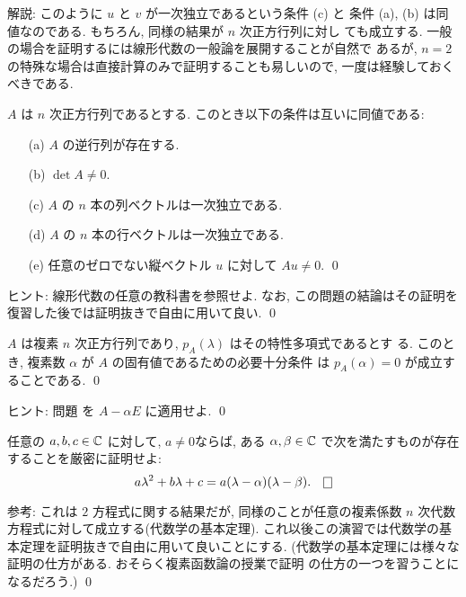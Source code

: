 \documentclass[12pt,twoside]{jarticle}
\begin{document}
\noindent 
解説: このように $u$ と $v$ が一次独立であるという条件 (c) と
条件 (a), (b) は同値なのである. もちろん, 同様の結果が $n$ 次正方行列に対し
ても成立する. 一般の場合を証明するには線形代数の一般論を展開することが自然で
あるが, $n=2$ の特殊な場合は直接計算のみで証明することも易しいので, 
一度は経験しておくべきである.


\begin{question}\label{q:det-nxn}
  $A$ は $n$ 次正方行列であるとする. このとき以下の条件は互いに同値である:
  \begin{enumerate}
  \item[(a)] $A$ の逆行列が存在する.
  \item[(b)] $\det A \ne 0$.
  \item[(c)] $A$ の $n$ 本の列ベクトルは一次独立である.
  \item[(d)] $A$ の $n$ 本の行ベクトルは一次独立である.
  \item[(e)] 任意のゼロでない縦ベクトル $u$ に対して $Au\ne0$.
    \qed
  \end{enumerate}
\end{question}

\noindent 
ヒント: 線形代数の任意の教科書を参照せよ. なお, 
この問題の結論はその証明を復習した後では証明抜きで自由に用いて良い.
\qed


\begin{question}
  $A$ は複素 $n$ 次正方行列であり, $p_A(\lambda)$ はその特性多項式であるとす
  る.  このとき, 複素数 $\alpha$ が $A$ の固有値であるための必要十分条件
  は $p_A(\alpha)=0$ が成立することである. 
  \qed
\end{question}

\noindent 
ヒント: 問題  を $A - \alpha E$ に適用せよ.
\qed


\begin{question}
  任意の $a,b,c\in{\mathbb C}$ に対して, $a\ne0$ならば, 
  ある $\alpha,\beta\in{\mathbb C}$ で次を満たすものが存在することを厳密に証明せよ:
  \begin{equation*}
    a \lambda^2 + b \lambda + c 
    = a(\lambda - \alpha)(\lambda - \beta).
    \qed
  \end{equation*}
\end{question}

\noindent 
参考: これは $2$ 方程式に関する結果だが, 
同様のことが任意の複素係数 $n$ 次代数方程式に対して成立する(代数学の基本定理). 
これ以後この演習では代数学の基本定理を証明抜きで自由に用いて良いことにする. 
(代数学の基本定理には様々な証明の仕方がある. おそらく複素函数論の授業で証明
の仕方の一つを習うことになるだろう.)
\qed
\end{document}
